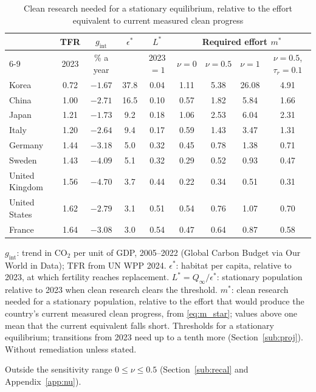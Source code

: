 \documentclass[11pt]{article}
\begin{document}
\begin{table}[h!]\centering
\begin{threeparttable}
\caption{Clean research needed for a stationary equilibrium, relative to the effort equivalent to current measured clean progress}
\label{tab:thresholds}
\label{tab:gaps}
\footnotesize
\setlength{\tabcolsep}{4.5pt}
\begin{tabular}{lcccccccc}
\toprule
 & TFR & $g_{\text{int}}$ & $\epsilon^\ast$ & $L^\ast$ & \multicolumn{4}{c}{Required effort $m^\ast$}\\
\cmidrule(lr){6-9}
 & 2023 & \% a year & & 2023 $=1$ & $\nu=0$ & $\nu=0.5$ & $\nu=1$\tnote{a} & $\nu=0.5$, $\tau_r=0.1$\\
\midrule
Korea          & 0.72 & $-1.67$ & 37.8 & 0.04 & 1.11 & 5.38 & 26.08 & 4.91\\
China          & 1.00 & $-2.71$ & 16.5 & 0.10 & 0.57 & 1.82 & 5.84 & 1.66\\
Japan          & 1.21 & $-1.73$ & 9.2 & 0.18 & 1.06 & 2.53 & 6.04 & 2.31\\
Italy          & 1.20 & $-2.64$ & 9.4 & 0.17 & 0.59 & 1.43 & 3.47 & 1.31\\
Germany        & 1.44 & $-3.18$ & 5.0 & 0.32 & 0.45 & 0.78 & 1.38 & 0.71\\
Sweden         & 1.43 & $-4.09$ & 5.1 & 0.32 & 0.29 & 0.52 & 0.93 & 0.47\\
United Kingdom & 1.56 & $-4.70$ & 3.7 & 0.44 & 0.22 & 0.34 & 0.51 & 0.31\\
United States  & 1.62 & $-2.79$ & 3.1 & 0.51 & 0.54 & 0.76 & 1.07 & 0.70\\
France         & 1.64 & $-3.08$ & 3.0 & 0.54 & 0.47 & 0.64 & 0.87 & 0.58\\
\bottomrule
\end{tabular}
\begin{tablenotes}\footnotesize
\item $g_{\text{int}}$: trend in CO$_2$ per unit of GDP, 2005--2022 (Global Carbon Budget via Our World in
Data); TFR from UN WPP 2024. $\epsilon^\ast$: habitat per capita, relative to 2023, at which fertility
reaches replacement. $L^\ast=Q_\infty/\epsilon^\ast$: stationary population relative to 2023 when clean
research clears the threshold. $m^\ast$: clean research needed for a stationary population, relative to
the effort that would produce the country's current measured clean progress, from \eqref{eq:m_star};
values above one mean that the current equivalent falls short. Thresholds for a stationary equilibrium;
transitions from 2023 need up to a tenth more (Section~\ref{sub:proj}). Without remediation unless stated.
\item[a] Outside the sensitivity range $0\le\nu\le0.5$ (Section~\ref{sub:recal} and Appendix~\ref{app:nu}).
\end{tablenotes}
\end{threeparttable}
\end{table}
\end{document}
